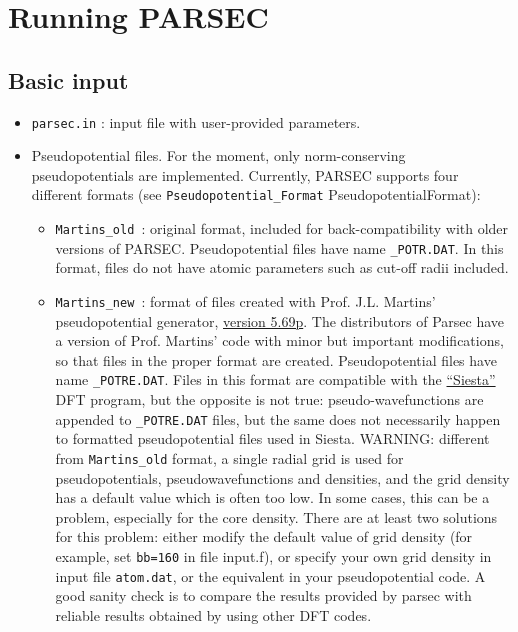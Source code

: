 \documentclass{article}
\begin{document}
\section{Running PARSEC}



\subsection{Basic input}

\begin{itemize}
\item {\tt parsec.in} : input file with user-provided parameters.

\label{InputPseudopotentials}
\item Pseudopotential files. For the moment, only  norm-conserving
  pseudopotentials are implemented. Currently, PARSEC supports four
  different formats (see {\tt Pseudopotential\_Format}
  {PseudopotentialFormat}):

\begin{itemize}
\item {\tt Martins\_old }: original format, included for
  back-compatibility with older versions of PARSEC. Pseudopotential files have
  name {\tt *\_POTR.DAT}. In this format, files do not have atomic parameters
  such as cut-off radii included.

\item {\tt Martins\_new }: format of files created with
  Prof. J.L. Martins' pseudopotential generator,
  \href{http://bohr.inesc-mn.pt/~jlm/pseudo.html}{version 5.69p}. The distributors of
  Parsec have a version of Prof. Martins' code with minor but
  important modifications, so that files in the proper format are
  created. Pseudopotential files have name {\tt  *\_POTRE.DAT}.
  Files in this format are compatible with the
  \href{http://www.uam.es/siesta/}{``Siesta''} DFT
  program, but the opposite is not true: pseudo-wavefunctions are
  appended to {\tt *\_POTRE.DAT} files, but the same does not
  necessarily happen to formatted pseudopotential files used in
  Siesta. WARNING: different from {\tt Martins\_old} format, a single
  radial grid is used for pseudopotentials, pseudowavefunctions and
  densities, and the grid density has a default value which is often too
  low. In some cases, this can be a problem, especially for the core
  density. There are at least two solutions for this problem: either
  modify the default value of grid density (for example, set {\tt bb=160}
  in file input.f), or specify your own grid density in input file
  {\tt atom.dat}, or the equivalent in your pseudopotential code. A
  good sanity check is to compare the results provided by parsec with
  reliable results obtained by using other DFT codes.


\end{itemize}
\end{itemize}
\end{document}
